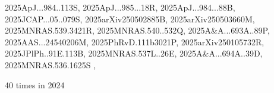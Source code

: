 \documentclass[12pt]{article}
\begin{document}
\begin{description}
{2025ApJ...984..113S,%
2025ApJ...985...18R,%
2025ApJ...984...88B,%
2025JCAP...05..079S,%
2025arXiv250502885B,%
2025arXiv250503660M,%
2025MNRAS.539.3421R,%
2025MNRAS.540..532Q,%
2025A&A...693A..89P,%
2025AAS...24540206M,%
2025PhRvD.111b3021P,%
2025arXiv250105732R,%
2025JPlPh..91E.113B,%
2025MNRAS.537L..26E,%
2025A&A...694A..39D,%
2025MNRAS.536.1625S%
}, \item %
40 times in 2024 \citep{
2024GMS...283..179C,%
BB24,
2024AGUFMSH13B2928M,%
2024arXiv241112953Z,%
2024PhFl...36k5152L,%
2024ApJ...975..251V,%
}
\end{description}
\end{document}
